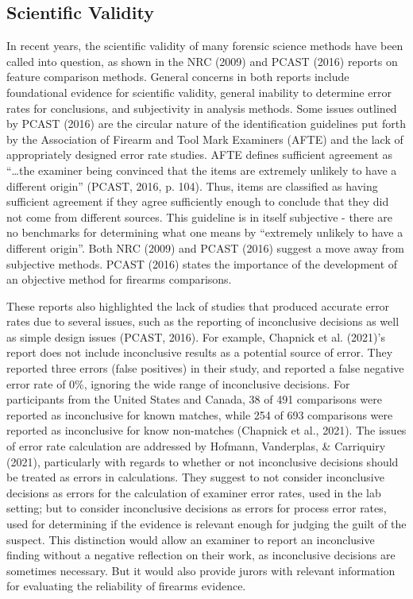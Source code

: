 \documentclass[print]{nuthesis}
\begin{document}
\hypertarget{scientific-validity}{%
\subsection{Scientific Validity}\label{scientific-validity}}

In recent years, the scientific validity of many forensic science methods have been called into question, as shown in the NRC (2009) and PCAST (2016) reports on feature comparison methods.
General concerns in both reports include foundational evidence for scientific validity, general inability to determine error rates for conclusions, and subjectivity in analysis methods.
Some issues outlined by PCAST (2016) are the circular nature of the identification guidelines put forth by the Association of Firearm and Tool Mark Examiners (AFTE) and the lack of appropriately designed error rate studies.
AFTE defines sufficient agreement as ``\ldots the examiner being convinced that the items are extremely unlikely to have a different origin'' (PCAST, 2016, p. 104).
Thus, items are classified as having sufficient agreement if they agree sufficiently enough to conclude that they did not come from different sources.
This guideline is in itself subjective - there are no benchmarks for determining what one means by ``extremely unlikely to have a different origin''.
Both NRC (2009) and PCAST (2016) suggest a move away from subjective methods.
PCAST (2016) states the importance of the development of an objective method for firearms comparisons.

These reports also highlighted the lack of studies that produced accurate error rates due to several issues, such as the reporting of inconclusive decisions as well as simple design issues (PCAST, 2016).
For example, Chapnick et al. (2021)'s report does not include inconclusive results as a potential source of error.
They reported three errors (false positives) in their study, and reported a false negative error rate of 0\%, ignoring the wide range of inconclusive decisions.
For participants from the United States and Canada, 38 of 491 comparisons were reported as inconclusive for known matches, while 254 of 693 comparisons were reported as inconclusive for know non-matches (Chapnick et al., 2021).
The issues of error rate calculation are addressed by Hofmann, Vanderplas, \& Carriquiry (2021), particularly with regards to whether or not inconclusive decisions should be treated as errors in calculations.
They suggest to not consider inconclusive decisions as errors for the calculation of examiner error rates, used in the lab setting; but to consider inconclusive decisions as errors for process error rates, used for determining if the evidence is relevant enough for judging the guilt of the suspect.
This distinction would allow an examiner to report an inconclusive finding without a negative reflection on their work, as inconclusive decisions are sometimes necessary.
But it would also provide jurors with relevant information for evaluating the reliability of firearms evidence.
\end{document}
